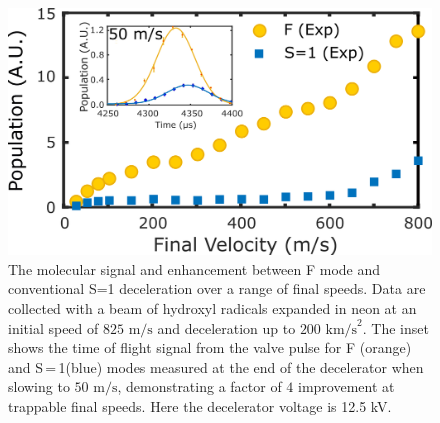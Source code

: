 \documentclass[%
 reprint,
 amsmath,amssymb,
 aps,
prl,
]{revtex4-1}
\begin{document}
\begin{figure}[t]
\includegraphics[width=\linewidth]{fig3.png}%
\vspace{-5pt}
\caption{\label{fig:alldata}
The molecular signal and enhancement between F mode and conventional S=1 deceleration over a range of final speeds. 
Data are collected with a beam of hydroxyl radicals expanded in neon at an initial speed of $825 \text{ m/s}$ and deceleration up to $200 \text{ km/s}^2$. 
The inset shows the time of flight signal from the valve pulse for F (orange) and S\,=\,1(blue) modes measured at the end of the decelerator when slowing to $50 \text{ m/s}$, demonstrating a factor of $4$ improvement at trappable final speeds. Here the decelerator voltage is 12.5 kV. 
\vspace{-4mm}}
\end{figure}
\end{document}
